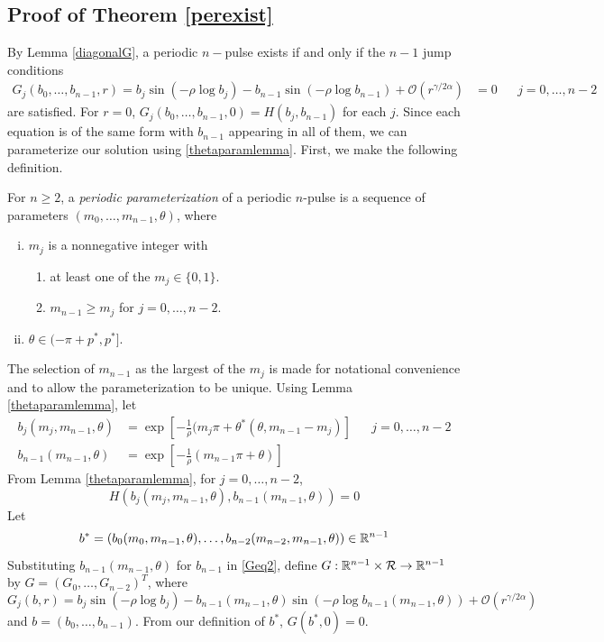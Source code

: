 \documentclass[thesis.tex]{subfiles}
\begin{document}
\subsection{Proof of Theorem \ref{perexist}}

By Lemma \ref{diagonalG}, a periodic $n-$pulse exists if and only if the $n-1$ jump conditions
\begin{align}\label{Geq2}
G_j(b_0, \dots, b_{n-1}, r) = b_j \sin \left( -\rho \log b_j \right) - b_{n-1} \sin \left( -\rho \log b_{n-1} \right) + \mathcal{O}(r^{\gamma / 2 \alpha}) &= 0 && j = 0, \dots, n-2
\end{align}
are satisfied. For $r = 0$, $G_j(b_0, \dots, b_{n-1}, 0) = H(b_j, b_{n-1})$ for each $j$. Since each equation is of the same form with $b_{n-1}$ appearing in all of them, we can parameterize our solution using \cref{thetaparamlemma}. First, we make the following definition.

\begin{definition}
For $n \geq 2$, a \emph{periodic parameterization} of a periodic $n$-pulse is a sequence of parameters $(m_0, \dots, m_{n-1}, \theta)$, where
\begin{enumerate}[(i)]
\item $m_j$ is a nonnegative integer with
\begin{enumerate}
\item at least one of the $m_j \in \{0, 1\}$.
\item $m_{n-1} \geq m_j$ for $j = 0, \dots, n-2$.
\end{enumerate}
\item $\theta \in (-\pi + p^*, p^*]$.
\end{enumerate}
\end{definition}
The selection of $m_{n-1}$ as the largest of the $m_j$ is made for notational convenience and to allow the parameterization to be unique. Using Lemma \ref{thetaparamlemma}, let
\begin{equation}\label{thetaparammulti}
\begin{aligned}
b_j( m_j, m_{n-1}, \theta) &= \exp\left[ -\frac{1}{\rho}(m_j \pi + \theta^*(\theta, m_{n-1} - m_j) \right] && j = 0, \dots, n-2 \\
b_{n-1}( m_{n-1}, \theta) &= \exp\left[ -\frac{1}{\rho}(m_{n-1} \pi + \theta) \right]
\end{aligned}
\end{equation}
From Lemma \ref{thetaparamlemma}, for $j = 0, \dots, n-2$,
\[
H(b_j( m_j, m_{n-1}, \theta), b_{n-1}( m_{n-1}, \theta) ) = 0
\]
Let
\[
b^* = (b_0( m_0, m_{n-1}, \theta), \dots, b_{n-2}( m_{n-2}, m_{n-1}, \theta) ) \in \mathbb{R}^{n-1}
\]
Substituting $b_{n-1}(m_{n-1}, \theta)$ for $b_{n-1}$ in \eqref{Geq2}, define $G: \mathbb{R}^{n-1} \times \mathcal{R} \rightarrow \mathbb{R}^{n-1}$ by $G = (G_0, \dots, G_{n-2})^T$, where 
\begin{equation*}
G_j(b, r) = b_j \sin \left( -\rho \log b_j \right) - b_{n-1}(m_{n-1}, \theta) \sin \left( -\rho \log b_{n-1}(m_{n-1}, \theta) \right) + \mathcal{O}(r^{\gamma / 2 \alpha})
\end{equation*}
and $b = (b_0, \dots, b_{n-1})$. From our definition of $b^*$, $G(b^*, 0) = 0$.
\end{document}
